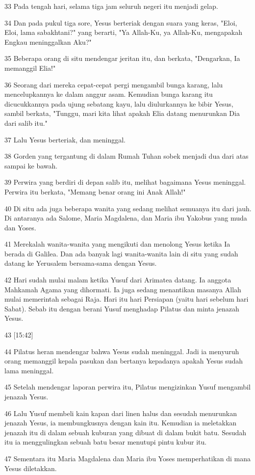 \par 33 Pada tengah hari, selama tiga jam seluruh negeri itu menjadi gelap.
\par 34 Dan pada pukul tiga sore, Yesus berteriak dengan suara yang keras, "Eloi, Eloi, lama sabakhtani?" yang berarti, "Ya Allah-Ku, ya Allah-Ku, mengapakah Engkau meninggalkan Aku?"
\par 35 Beberapa orang di situ mendengar jeritan itu, dan berkata, "Dengarkan, Ia memanggil Elia!"
\par 36 Seorang dari mereka cepat-cepat pergi mengambil bunga karang, lalu mencelupkannya ke dalam anggur asam. Kemudian bunga karang itu dicucukkannya pada ujung sebatang kayu, lalu diulurkannya ke bibir Yesus, sambil berkata, "Tunggu, mari kita lihat apakah Elia datang menurunkan Dia dari salib itu."
\par 37 Lalu Yesus berteriak, dan meninggal.
\par 38 Gorden yang tergantung di dalam Rumah Tuhan sobek menjadi dua dari atas sampai ke bawah.
\par 39 Perwira yang berdiri di depan salib itu, melihat bagaimana Yesus meninggal. Perwira itu berkata, "Memang benar orang ini Anak Allah!"
\par 40 Di situ ada juga beberapa wanita yang sedang melihat semuanya itu dari jauh. Di antaranya ada Salome, Maria Magdalena, dan Maria ibu Yakobus yang muda dan Yoses.
\par 41 Merekalah wanita-wanita yang mengikuti dan menolong Yesus ketika Ia berada di Galilea. Dan ada banyak lagi wanita-wanita lain di situ yang sudah datang ke Yerusalem bersama-sama dengan Yesus.
\par 42 Hari sudah mulai malam ketika Yusuf dari Arimatea datang. Ia anggota Mahkamah Agama yang dihormati. Ia juga sedang menantikan masanya Allah mulai memerintah sebagai Raja. Hari itu hari Persiapan (yaitu hari sebelum hari Sabat). Sebab itu dengan berani Yusuf menghadap Pilatus dan minta jenazah Yesus.
\par 43 [15:42]
\par 44 Pilatus heran mendengar bahwa Yesus sudah meninggal. Jadi ia menyuruh orang memanggil kepala pasukan dan bertanya kepadanya apakah Yesus sudah lama meninggal.
\par 45 Setelah mendengar laporan perwira itu, Pilatus mengizinkan Yusuf mengambil jenazah Yesus.
\par 46 Lalu Yusuf membeli kain kapan dari linen halus dan sesudah menurunkan jenazah Yesus, ia membungkusnya dengan kain itu. Kemudian ia meletakkan jenazah itu di dalam sebuah kuburan yang dibuat di dalam bukit batu. Sesudah itu ia menggulingkan sebuah batu besar menutupi pintu kubur itu.
\par 47 Sementara itu Maria Magdalena dan Maria ibu Yoses memperhatikan di mana Yesus diletakkan.


